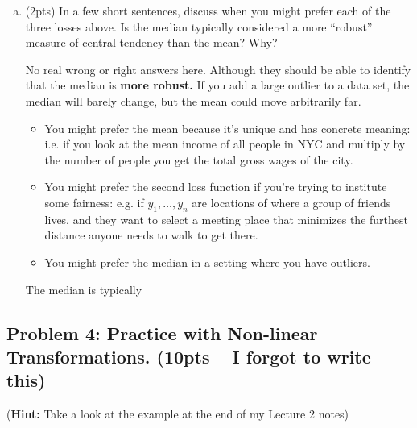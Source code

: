 \documentclass[10pt]{article}
\begin{document}
\begin{enumerate}[(a)]
	
	\item (2pts) In a few short sentences, discuss when you might prefer each of the three losses above. Is the median typically considered a more ``robust'' measure of central tendency than the mean? Why?
	
	No real wrong or right answers here. Although they should be able to identify that the median is \textbf{more robust.} If you add a large outlier to a data set, the median will barely change, but the mean could move arbitrarily far.
	\begin{itemize}
		\item You might prefer the mean because it's unique and has concrete meaning: i.e. if you look at the mean income of all people in NYC and multiply by the number of people you get the total gross wages of the city. 
		\item You might prefer the second loss function if you're trying to institute some fairness: e.g. if $y_1, \ldots, y_n$ are locations of where a group of friends lives, and they want to select a meeting place that minimizes the furthest distance anyone needs to walk to get there.
		\item You might prefer the median in a setting where you have outliers.
	\end{itemize}
	
	The median is typically 
\end{enumerate}

\newpage
\subsection{Problem 4: Practice with Non-linear Transformations. (10pts -- I forgot to write this)}
(\textbf{Hint:} Take a look at the example at the end of my Lecture 2 notes)
\vspace{.5em}
\end{document}
